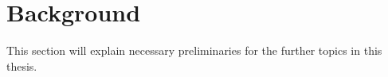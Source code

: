 \section{Background} \label{background}

This section will explain necessary preliminaries for the further topics in this thesis.





